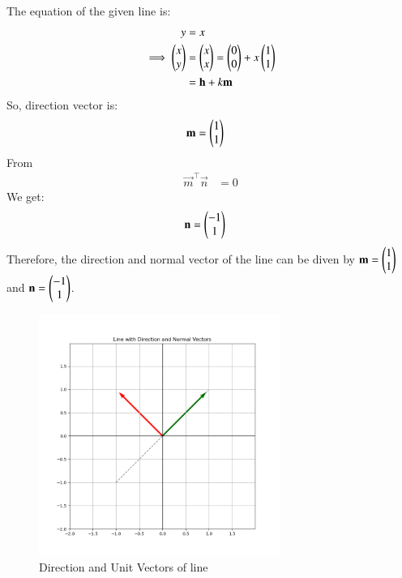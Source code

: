 \documentclass[journal]{IEEEtran}
\begin{document}
The equation of the given line is:
\begin{align}
	y&=x\\
	\implies \begin{pmatrix}x \\ y\end{pmatrix} &= \begin{pmatrix}x\\ x\end{pmatrix} = \begin{pmatrix}0\\0\end{pmatrix} + x\begin{pmatrix}1\\1\end{pmatrix}\\
	&=\mathbf{h} + k\mathbf{m}
\end{align}
So, direction vector is:
\begin{align}
	\mathbf{m} &= \begin{pmatrix}1\\1\end{pmatrix}
\end{align}
From 
\begin{align}
	\vec{m}^\top\vec{n}&=0
\end{align}
We get:
\begin{align}
	\mathbf{n}&=\begin{pmatrix}-1\\1\end{pmatrix}
\end{align}
Therefore, the direction and normal vector of the line can be diven by $\mathbf{m} =\begin{pmatrix}1\\1\end{pmatrix}$ and $\mathbf{n} = \begin{pmatrix}-1\\1\end{pmatrix}$.
\newpage
\begin{figure}[h!]
\begin{center}
	\includegraphics[width=0.7\textwidth]{Fig/fig.png}
	\caption{Direction and Unit Vectors of line}
	\label{fig:4-4.2-13 - Figure -1}
\end{center}
\end{figure}
\end{document}
